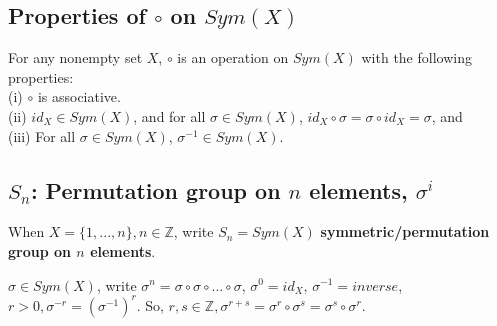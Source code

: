 \documentclass[11pt]{elegantbook}
\begin{document}
\subsection{Properties of $\circ$ on $Sym(X)$}
\begin{proposition}[Proposition 1.3.1.]
    For any nonempty set $X$, $\circ$ is an operation on $Sym(X)$ with the following properties:\\
(i) $\circ$ is associative.\\
(ii) $id_X\in Sym(X)$, and for all $\sigma \in Sym(X)$, $id_X\circ\sigma=\sigma\circ id_X=\sigma$, and\\
(iii) For all $\sigma \in Sym(X)$, $\sigma^{-1} \in Sym(X)$.
\end{proposition}

\subsection{$S_n$: Permutation group on $n$ elements, $\sigma^i$}
\begin{note}
    When $X=\{1,...,n \}, n\in \mathbb{Z}$, write $S_n=Sym(X)$ \textbf{symmetric/permutation group on $n$ elements}.
\end{note}
\begin{note}
    $\sigma \in Sym(X)$, write $\sigma^n=\sigma\circ\sigma\circ...\circ\sigma$, $\sigma^0=id_X$, $\sigma^{-1}=inverse$, $r>0, \sigma^{-r}=(\sigma^{-1})^r$. So, $r,s\in \mathbb{Z}, \sigma^{r+s}=\sigma^r\circ\sigma^s=\sigma^s\circ\sigma^r$.
\end{note}
\end{document}

